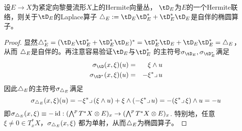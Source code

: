 
\begin{thm}
设$E\to X$为紧定向黎曼流形$X$上的Hermite向量丛，
$\tD_E$为$E$的一个Hermite联络，则关于$\tD_E$的Laplace算子
$\yc_E:=\tD_E\tD_E^*+\tD_E^*\tD_E$是自伴的椭圆算子。
\end{thm}

\begin{proof}
显然$\yc_E^*=(\tD_E\tD_E^*+\tD_E^*\tD_E)^*=\tD_E^*\tD_E+\tD_E\tD_E^*=\yc_E$，
从而 $\triangle_E$是自伴的。再注意容易验证$\tD_E$与$\tD_E^*$
的主符号$\sgm_{\tD_E},\sgm_{\tD_{E}^*}$满足
\begin{eqnarray*}
\sgm_{\tD  }(x,\xi)(u)&=&\xi\wedge u\\
\sgm_{\tD^*}(x,\xi)(u)&=&-\xi^*\suobing u
\end{eqnarray*}
因此$\triangle_E$的主符号$\sigma_{\triangle_E}$满足
$$
  \sigma_{\triangle_E}(x,\xi)(u)
=
  -\xi^*\lrcorner\,(\xi\wedge u)
  +\xi\wedge(-\xi^*\lrcorner\, u)
=
  -(\xi^*\lrcorner\,\xi)\wedge u
=
  -u
$$
即$\sigma_{\triangle_E}(x,\xi)\equiv-\operatorname{id}:
(\bigwedge\nolimits^{p}T^*X\otimes E)_x\to(\bigwedge\nolimits^{p}T^*X\otimes E)_x$.
特别地，任意$\xi\neq 0\in T^*_xX$，$\sigma_{\triangle_E}(x,\xi)$
都为单射，从而$\triangle_E$为椭圆算子。
\end{proof}


